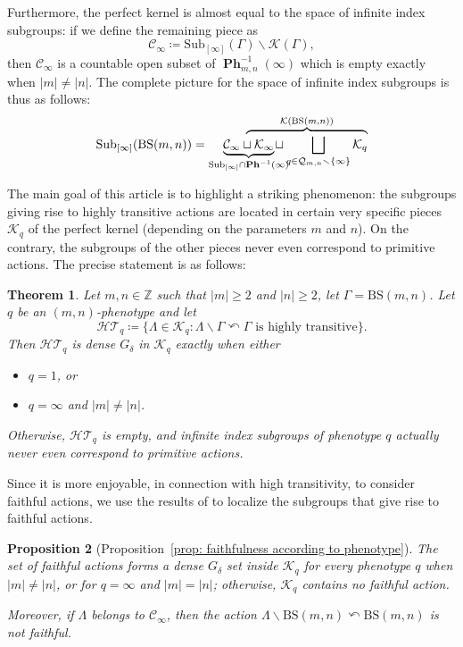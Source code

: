 \documentclass[12pt]{article}
\numberwithin{equation}{section}
\newtheorem{theoremintro}{Theorem}
\newtheorem{propositionintro}[theoremintro]{Proposition}
\theoremstyle{definition}
\newcommand{\Z}{\mathbb{Z}}
\newcommand{\inv}{^{-1}}
\newcommand{\abs}[1]{\left\lvert #1\right\rvert}
\newcommand{\PK}{\mathcal{K}}
\newcommand\BSo{\mathrm{BS}}
\DeclareMathOperator\PHE{\mathbf{Ph}}
\newcommand{\Sub}{\mathrm{Sub}}
\newcommand{\bs}{\backslash}
\begin{document}
Furthermore, the perfect kernel is almost equal to the space of infinite index subgroups:
if we define the remaining piece as 
\[\mathcal{C}_{\infty}\coloneqq\Sub_{[\infty]}(\Gamma)\smallsetminus \PK(\Gamma),\] 
then 
\(\mathcal C_\infty\) is a countable open subset of \(\PHE_{m,n}\inv(\infty)\) which is empty
exactly when \(\abs m\neq \abs n\). 
The complete picture for the space of infinite index subgroups 
is thus as follows:
%
\[
\Sub_{[\infty]}(\BSo(m,n))= \underbrace{\mathcal{C}_{\infty}\sqcup {\PK_{\infty}}}_{\Sub_{[\infty]}\cap \PHE\inv(\infty)}\
\phantom{aaaaaaaaaaa}\llap{$\overbrace{\phantom{aaaa}
\sqcup \bigsqcup_{q\in\mathcal Q_{m,n}\smallsetminus\{\infty\}} \PK_q}^{\PK(\BSo(m,n))}$}
\]


The main goal of this article is to highlight a striking phenomenon: 
the subgroups giving rise to highly transitive actions are located in 
certain very specific pieces $\PK_q$ of the perfect kernel 
(depending on the parameters $m$ and $n$). 
On the contrary, the subgroups of the other pieces never even 
correspond to primitive actions.
The precise statement is as follows:
\begin{theoremintro}
\label{th-intro: HT generic in Ph= 1 and oo}
    Let \( m,n\in\Z \) such that \( \abs{m}\geq 2 \) and \( \abs{n}\geq 2 \), 
	let  \( \Gamma=\BSo(m,n) \). 
	Let \( q \) be an \( (m,n) \)-phenotype and let 
    \[
	\mathcal{HT}_q\coloneqq \{\Lambda\in\PK_q \colon 
					\Lambda\bs\Gamma\curvearrowleft \Gamma\text{ is highly transitive}\}.
	\]
    Then \( \mathcal{HT}_q\) is dense \( G_\delta \) in \( \PK_q  \) exactly when either
    \begin{itemize}
        \item  \( q=1 \),  or
        \item  \( q=\infty \) and  \( \abs{m} \neq \abs{n} \).
    \end{itemize}
Otherwise, \( \mathcal{HT}_q \) is empty, 
and infinite index subgroups of phenotype \(q\)
actually never even correspond to primitive actions.  
\end{theoremintro}






Since it is more enjoyable, in connection with high transitivity, to consider faithful actions, 
we use the results of \cite{CGLMS-22} to localize the subgroups that give rise to faithful actions.

\begin{propositionintro}[Proposition~\ref{prop: faithfulness according to phenotype}]
\label{prop-intro: faithfulness according to phenotype}
The set of faithful actions forms a dense \( G_\delta \) set inside $\PK_q$ for every phenotype $q$ when $\abs{m} \neq \abs{n}$, or for $q=\infty$ and $\abs{m} = \abs{n}$; otherwise, $\PK_q$ contains no faithful action. 


Moreover, if $\Lambda$ belongs to $\mathcal{C}_\infty$, 
then the action $\Lambda\bs \BSo(m,n)\curvearrowleft \BSo(m,n)$ is not faithful.
\end{propositionintro}
\end{document}
